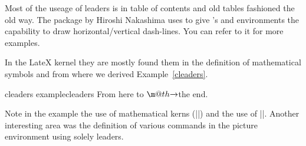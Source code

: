 Most of the useage of leaders is in table of contents and old tables fashioned the old way. The package  by Hiroshi Nakashima uses  to give \latex’s  and  environments the capability to draw horizontal/vertical dash-lines. You can refer to it for more examples.

In the LateX kernel they are mostly found them in the definition of mathematical symbols and from where we derived Example~\ref{cleaders}.

\begin{texexample}{cleaders example}{cleaders}
 \makeatletter
 \def\rightarrowfill{$\m@th\smash-\mkern-7mu%
  \cleaders\hbox{$\mkern-2mu\smash-\mkern-2mu$}\hfill
  \mkern-7mu\mathord\rightarrow$}
 \makeatother
From here to \rightarrowfill the end.
\end{texexample}

Note in the example the use of mathematical kerns (|\mkern|) and the use of 
|\smash|. Another interesting area was the definition of various commands in the
picture environment using solely leaders.


















